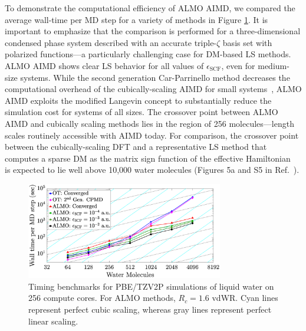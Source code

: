 \documentclass[aip,jcp,reprint,amsmath,amssymb]{revtex4-1}
\begin{document}
To demonstrate the computational efficiency of ALMO AIMD, we compared the average wall-time per MD step for a variety of methods in Figure \ref{fig:strongscaling_log}.
It is important to emphasize that the comparison is performed for a three-dimensional condensed phase system described with an accurate triple-$\zeta$ basis set with polarized functions---a particularly challenging case for DM-based LS methods.
ALMO AIMD shows clear LS behavior for all values of $\epsilon_{\text{SCF}}$, even for medium-size systems. While the second generation Car-Parrinello method decreases the computational overhead of the cubically-scaling AIMD for small systems~\cite{a:2ndcpmd}, ALMO AIMD exploits the modified Langevin concept to substantially reduce the simulation cost for systems of all sizes.
The crossover point between ALMO AIMD and cubically scaling methods lies in the region of 256 molecules---length scales routinely accessible with AIMD today. For comparison, the crossover point between the cubically-scaling DFT and a representative LS method that computes a sparse DM as the matrix sign function of the effective Hamiltonian~\cite{a:ls-dm-sign} is expected to lie well above 10,000 water molecules (Figures 5a and S5 in Ref.~).


\begin{figure}
\includegraphics[trim={2.5cm 0.5cm 3.4cm 0.9cm},clip,width=8.6cm]{3.eps}
\caption{\label{fig:strongscaling_log} Timing benchmarks for PBE/TZV2P simulations of liquid water on 256 compute cores. 
For ALMO methods, $R_{c} = 1.6$ vdWR. 
Cyan lines represent perfect cubic scaling, whereas gray lines represent perfect linear scaling. 
}
\end{figure}
\end{document}
